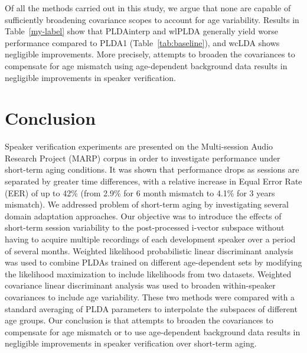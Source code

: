 \documentclass[a4paper]{article}
\begin{document}
Of all the methods carried out in this study, we argue that none are capable of sufficiently broadening covariance scopes to account for age variability. Results in Table~\ref{my-label} show that PLDAinterp and wlPLDA generally yield worse performance compared to PLDA1 (Table~\ref{tab:baseline}), and wcLDA shows negligible improvements. More precisely, attempts to broaden the covariances to compensate for age mismatch using age-dependent background data results in negligible improvements in speaker verification. 

\section{Conclusion}
Speaker verification experiments are presented on the Multi-session Audio Research Project (MARP) corpus in order to investigate performance under short-term aging conditions. It was shown that performance drops as sessions are separated by greater time differences, with a relative increase in Equal Error Rate (EER) of up to 42\% (from 2.9\% for 6 month mismatch to 4.1\% for 3 years mismatch). We addressed problem of short-term aging by investigating several domain adaptation approaches. Our objective was to introduce the effects of short-term session variability to the post-processed i-vector subspace without having to acquire multiple recordings of each development speaker over a period of several months. Weighted likelihood probabilistic linear discriminant analysis was used to combine PLDAs trained on different age-dependent sets by modifying the likelihood maximization to include likelihoods from two datasets. Weighted covariance linear discriminant analysis was used to broaden within-speaker covariances to include age variability. These two methods were compared with a standard averaging of PLDA parameters to interpolate the subspaces of different age groups. Our conclusion is that attempts to broaden the covariances to compensate for age mismatch or to use age-dependent background data results in negligible improvements in speaker verification over short-term aging. 

  \newpage
  

  
\end{document}
